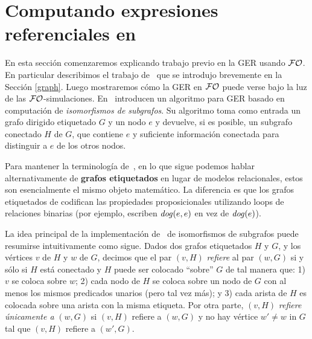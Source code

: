 \section{Computando expresiones referenciales en \FOL}
\label{sec:computandoEnFOL}
En esta secci\'on comenzaremos explicando trabajo previo en la GER usando $\mathcal{FO}$. En particular describimos el trabajo de~\cite{graph} que se introdujo brevemente en la Secci\'on \ref{graph}. Luego mostraremos c\'omo la GER en $\mathcal{FO}$ puede verse bajo la luz de las $\mathcal{FO}$-simulaciones.
En~\cite{graph} introducen un algoritmo para GER basado en computaci\'on de \emph{isomorfismos de subgrafos}. Su algoritmo toma como entrada
un grafo dirigido etiquetado $G$ y un nodo $e$ y devuelve, si es posible,
un subgrafo conectado $H$  de $G$, que contiene $e$ y suficiente informaci\'on conectada para
distinguir a $e$ de los otros nodos.

Para mantener la terminolog\'ia de~\cite{graph}, en lo que sigue
podemos hablar alternativamente de \textbf{grafos etiquetados} en lugar de modelos relacionales, estos son esencialmente el mismo objeto matem\'atico. La diferencia es que los grafos etiquetados de \cite{graph} codifican las propiedades proposicionales utilizando
loops de relaciones binarias (por ejemplo, escriben $\mathit{dog}(e,e)$ en vez de $\mathit{dog}(e)$).

La idea principal de la implementaci\'on de~\cite{graph} de isomorfismos de subgrafos puede resumirse intuitivamente como sigue.
Dados dos grafos etiquetados $H$ y $G$, y los v\'ertices  $v$ de $H$
y $w$ de $G$, decimos que el par $(v, H)$ {\em refiere}
al par $(w, G)$ si y s\'olo si $H$ est\'a conectado y $H$ puede ser colocado ``sobre'' $G$ de tal manera que: 1) $v$ se coloca sobre $w$; 2) cada
nodo de $H$ se coloca sobre un nodo de $G$ con al menos los mismos
predicados unarios (pero tal vez m\'as); y 3) cada arista de $H$ es
colocada sobre una arista con la misma etiqueta. Por otra parte, $(v, H)$ {\em
refiere \'unicamente a} $(w, G)$ si $(v, H)$ refiere a $(w, G)$ y no hay
v\'ertice $w'\not=w$ in $G$ tal que $(v, H)$ refiere a $(w', G)$.

